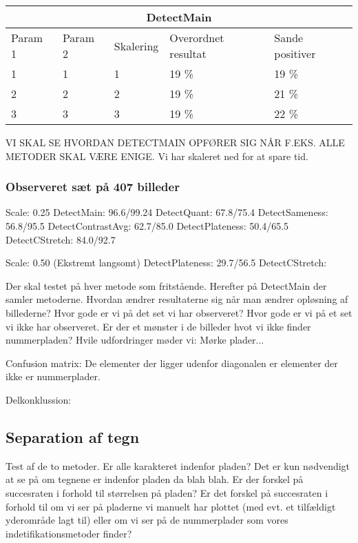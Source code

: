 \begin{tabular}{|l|l|l|l|l|}
\hline
\multicolumn{5}{|c|}{DetectMain} \\ \hline
Param 1 & Param 2 & Skalering & Overordnet resultat & Sande positiver\\ \hline
1 & 1 & 1 & 19 \% & 19 \%\\ \hline
2 & 2 & 2 & 19 \% & 21 \% \\ \hline
3 & 3 & 3 & 19 \% & 22 \% \\
\hline
\end{tabular}


VI SKAL SE HVORDAN DETECTMAIN OPFØRER SIG NÅR F.EKS. ALLE METODER SKAL VÆRE ENIGE.
 Vi har skaleret ned for at spare tid.

\subsubsection*{Observeret sæt på 407 billeder}
Scale: 0.25
DetectMain: 96.6/99.24
DetectQuant: 67.8/75.4
DetectSameness: 56.8/95.5
DetectContrastAvg: 62.7/85.0
DetectPlateness: 50.4/65.5
DetectCStretch: 84.0/92.7

Scale: 0.50 (Ekstremt langsomt)
DetectPlateness: 29.7/56.5
DetectCStretch:

Der skal testet på hver metode som fritstående. Herefter på DetectMain der samler metoderne. Hvordan ændrer resultaterne sig når man ændrer opløsning af billederne?
Hvor gode er vi på det set vi har observeret? Hvor gode er vi på et set vi ikke har observeret. Er der et mønster i de billeder hvot vi ikke finder nummerpladen? Hvile udfordringer møder vi: Mørke plader... 

Confusion matrix: De elementer der ligger udenfor diagonalen er elementer der ikke er nummerplader.




Delkonklussion:


\subsection{Separation af tegn}
Test af de to metoder.
Er alle karakteret indenfor pladen? Det er kun nødvendigt at se på om tegnene er indenfor pladen da blah blah. Er der forskel på succesraten i forhold til størrelsen på pladen? Er det forskel på succesraten i forhold til om vi ser på pladerne vi manuelt har plottet (med evt. et tilfældigt yderområde lagt til) eller om vi ser på de nummerplader som vores indetifikationsmetoder finder?

